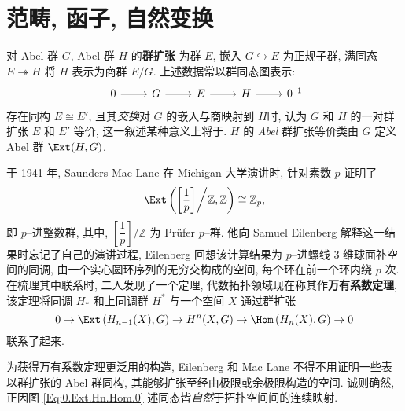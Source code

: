 \chapter{范畴, 函子, 自然变换}\label{Chap.Cat.Funct.NormTranf}

\par 对 Abel 群 \(G\), Abel 群 \(H\) 的\textbf{群扩张} 为群 \(E\), 嵌入 \(G\hookrightarrow E\) 为正规子群, 满同态 \(E\twoheadrightarrow H\) 将 \(H\) 表示为商群 \(E/G\). 上述数据常以群同态图表示:\[
    \begin{tikzcd}
        0 \ar[r] & G \ar[r] & E \ar[r] & H \ar[r] & 0 
    \end{tikzcd}\footnotemark
\]
存在同构 \(E\cong E'\), 且其\textit{交换}对 \(G\) 的嵌入与商映射到 \(H\)时, 认为 \(G\) 和 \(H\) 的一对群扩张 \(E\) 和 \(E'\) 等价, 这一叙述某种意义上将于. \(H\) 的 \textit{Abel} 群扩张等价类由 \(G\) 定义 Abel 群 \(\Ext(H,G)\).
\par 于 1941 年, Saunders Mac Lane 在 Michigan 大学演讲时, 针对素数 \(p\) 证明了
        \[\Ext\left(
            \left[
                \dfrac{1}{p}
            \right]
                \middle/
            \mathbb{Z},\mathbb{Z}
        \right) \cong \mathbb{Z}_p,\] 
即 \(p\)--进整数群, 其中, \(\left[\dfrac{1}{p}\right]\bigg/ \mathbb{Z}\) 为 Pr\"ufer \(p\)--群. 他向 Samuel Eilenberg 解释这一结果时忘记了自己的演讲过程, Eilenberg 回想该计算结果为 \(p\)--进螺线 3 维球面补空间的同调, 由一个实心圆环序列的无穷交构成的空间, 每个环在前一个环内绕 \(p\) 次. 在梳理其中联系时, 二人发现了一个定理, 代数拓扑领域现在称其作\textbf{万有系数定理}, 该定理将同调 \(H_*\) 和上同调群 \(H^*\) 与一个空间 \(X\) 通过群扩张\cite{ML05}
\begin{equation}\label{Eq:0.Ext.Hn.Hom.0}
    0\rightarrow\Ext\left(H_{n-1}(X),G\right)\rightarrow H^n(X,G)\rightarrow\Hom\left(H_n(X),G\right)\rightarrow 0
\end{equation}
联系了起来.
\par 为获得万有系数定理更泛用的构造, Eilenberg 和 Mac Lane 不得不用证明一些表以群扩张的 Abel 群同构, 其能够扩张至经由极限或余极限构造的空间. 诚则确然, 正因图 \eqref{Eq:0.Ext.Hn.Hom.0} 述同态皆\textit{自然}于拓扑空间间的连续映射.
